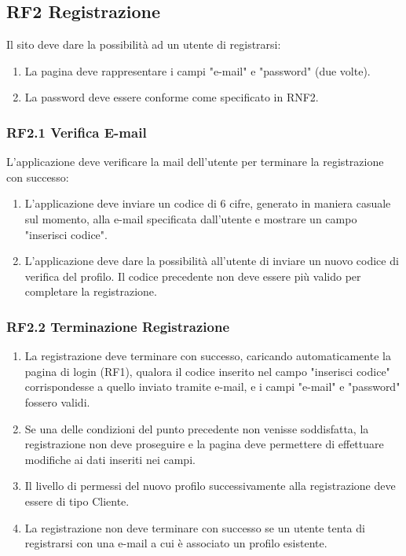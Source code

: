 \documentclass{report}
\begin{document}
\subsection*{RF2 Registrazione}
Il sito deve dare la possibilità ad un utente di registrarsi:
\begin{enumerate}
	\item La pagina deve rappresentare i campi "e-mail" e "password" (due volte). 
	\item La password deve essere conforme come specificato in RNF2.
\end{enumerate}

\subsubsection*{RF2.1 Verifica E-mail}
L'applicazione deve verificare la mail dell'utente per terminare la registrazione con successo:

\begin{enumerate}
	\item L'applicazione deve inviare un codice di 6 cifre, generato in maniera casuale sul momento, alla e-mail specificata dall’utente e mostrare un campo "inserisci codice".
		
	\item L'applicazione deve dare la possibilità all’utente di inviare un nuovo codice di verifica del profilo. Il codice precedente non deve essere più valido per completare la registrazione.
		
\end{enumerate}


\subsubsection*{RF2.2 Terminazione Registrazione}
\begin{enumerate}
	\item La registrazione deve terminare con successo, caricando automaticamente la pagina di login (RF1), qualora il codice inserito nel campo "inserisci codice" corrispondesse a quello inviato tramite e-mail, e i campi "e-mail" e "password" fossero validi.
	\item Se una delle condizioni del punto precedente non venisse soddisfatta, la registrazione non deve proseguire e la pagina deve permettere di effettuare modifiche ai dati inseriti nei campi.
	\item Il livello di permessi del nuovo profilo successivamente alla registrazione deve essere di tipo Cliente.
	\item La registrazione non deve terminare con successo se un utente tenta di registrarsi con una e-mail a cui è associato un profilo esistente.

\end{enumerate}
\end{document}
